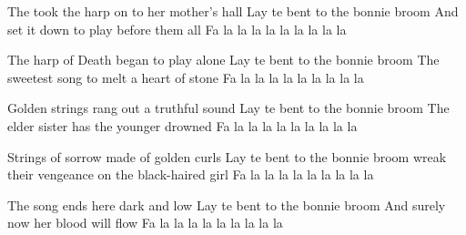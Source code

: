 \beginverse
The took the harp on to her mother's hall
Lay te bent to the bonnie broom
And set it down to play before them all
Fa la la la la la la la la la
\endverse

\beginverse
The harp of Death began to play alone
Lay te bent to the bonnie broom
The sweetest song to melt a heart of stone
Fa la la la la la la la la la
\endverse

\beginverse
Golden strings rang out a truthful sound
Lay te bent to the bonnie broom
The elder sister has the younger drowned
Fa la la la la la la la la la
\endverse

\beginverse
Strings of sorrow made of golden curls
Lay te bent to the bonnie broom
wreak their vengeance on the black-haired girl
Fa la la la la la la la la la
\endverse

\beginverse
The song ends here dark and low
Lay te bent to the bonnie broom
And surely now her blood will flow
Fa la la la la la la la la la
\endverse

\endsong